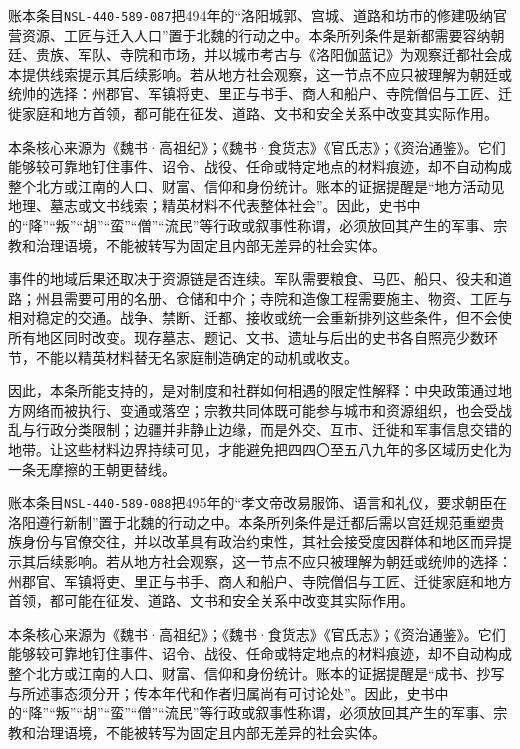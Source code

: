 账本条目\texttt{NSL-440-589-087}把494年的“洛阳城郭、宫城、道路和坊市的修建吸纳官营资源、工匠与迁入人口”置于北魏的行动之中。本条所列条件是新都需要容纳朝廷、贵族、军队、寺院和市场，并以城市考古与《洛阳伽蓝记》为观察迁都社会成本提供线索提示其后续影响。若从地方社会观察，这一节点不应只被理解为朝廷或统帅的选择：州郡官、军镇将吏、里正与书手、商人和船户、寺院僧侣与工匠、迁徙家庭和地方首领，都可能在征发、道路、文书和安全关系中改变其实际作用。

本条核心来源为《魏书·高祖纪》；《魏书·食货志》《官氏志》；《资治通鉴》。它们能够较可靠地钉住事件、诏令、战役、任命或特定地点的材料痕迹，却不自动构成整个北方或江南的人口、财富、信仰和身份统计。账本的证据提醒是“地方活动见地理、墓志或文书线索；精英材料不代表整体社会”。因此，史书中的“降”“叛”“胡”“蛮”“僧”“流民”等行政或叙事性称谓，必须放回其产生的军事、宗教和治理语境，不能被转写为固定且内部无差异的社会实体。

事件的地域后果还取决于资源链是否连续。军队需要粮食、马匹、船只、役夫和道路；州县需要可用的名册、仓储和中介；寺院和造像工程需要施主、物资、工匠与相对稳定的交通。战争、禁断、迁都、接收或统一会重新排列这些条件，但不会使所有地区同时改变。现存墓志、题记、文书、遗址与后出的史书各自照亮少数环节，不能以精英材料替无名家庭制造确定的动机或收支。

因此，本条所能支持的，是对制度和社群如何相遇的限定性解释：中央政策通过地方网络而被执行、变通或落空；宗教共同体既可能参与城市和资源组织，也会受战乱与行政分类限制；边疆并非静止边缘，而是外交、互市、迁徙和军事信息交错的地带。让这些材料边界持续可见，才能避免把四四〇至五八九年的多区域历史化为一条无摩擦的王朝更替线。

账本条目\texttt{NSL-440-589-088}把495年的“孝文帝改易服饰、语言和礼仪，要求朝臣在洛阳遵行新制”置于北魏的行动之中。本条所列条件是迁都后需以宫廷规范重塑贵族身份与官僚交往，并以改革具有政治约束性，其社会接受度因群体和地区而异提示其后续影响。若从地方社会观察，这一节点不应只被理解为朝廷或统帅的选择：州郡官、军镇将吏、里正与书手、商人和船户、寺院僧侣与工匠、迁徙家庭和地方首领，都可能在征发、道路、文书和安全关系中改变其实际作用。

本条核心来源为《魏书·高祖纪》；《魏书·食货志》《官氏志》；《资治通鉴》。它们能够较可靠地钉住事件、诏令、战役、任命或特定地点的材料痕迹，却不自动构成整个北方或江南的人口、财富、信仰和身份统计。账本的证据提醒是“成书、抄写与所述事态须分开；传本年代和作者归属尚有可讨论处”。因此，史书中的“降”“叛”“胡”“蛮”“僧”“流民”等行政或叙事性称谓，必须放回其产生的军事、宗教和治理语境，不能被转写为固定且内部无差异的社会实体。

